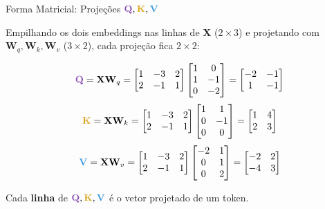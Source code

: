 \documentclass[aspectratio=169,xcolor=dvipsnames]{beamer}
\newcommand{\Qc}{\textcolor{qcolor}{\mathbf{Q}}}
\newcommand{\Kc}{\textcolor{kcolor}{\mathbf{K}}}
\newcommand{\Vc}{\textcolor{vcolor}{\mathbf{V}}}
\begin{document}
\begin{frame}[shrink=10]{Forma Matricial: Projeções $\Qc, \Kc, \Vc$}

Empilhando os dois embeddings nas linhas de $\mathbf{X}$ ($2\times3$) e projetando com $\mathbf{W}_q, \mathbf{W}_k, \mathbf{W}_v$ ($3\times2$), cada projeção fica $2\times2$:

\vspace{2pt}
\[
\Qc = \mathbf{X} \mathbf{W}_q =
\begin{bmatrix} 1 & -3 & 2 \\ 2 & -1 & 1 \end{bmatrix}
\begin{bmatrix} 1 & 0 \\ 1 & -1 \\ 0 & -2 \end{bmatrix}
= \begin{bmatrix} -2 & -1 \\ 1 & -1 \end{bmatrix}
\]
\[
\Kc = \mathbf{X} \mathbf{W}_k =
\begin{bmatrix} 1 & -3 & 2 \\ 2 & -1 & 1 \end{bmatrix}
\begin{bmatrix} 1 & 1 \\ 0 & -1 \\ 0 & 0 \end{bmatrix}
= \begin{bmatrix} 1 & 4 \\ 2 & 3 \end{bmatrix}
\]
\[
\Vc = \mathbf{X} \mathbf{W}_v =
\begin{bmatrix} 1 & -3 & 2 \\ 2 & -1 & 1 \end{bmatrix}
\begin{bmatrix} -2 & 1 \\ 0 & 1 \\ 0 & 2 \end{bmatrix}
= \begin{bmatrix} -2 & 2 \\ -4 & 3 \end{bmatrix}
\]

\vspace{2pt}
\centering
Cada \textbf{linha} de $\Qc, \Kc, \Vc$ é o vetor projetado de um token.

\end{frame}

\end{document}
